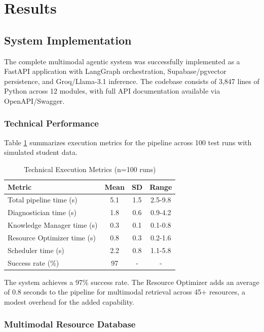 \section{Results}

\subsection{System Implementation}

The complete multimodal agentic system was successfully implemented as a FastAPI application with LangGraph orchestration, Supabase/pgvector persistence, and Groq/Llama-3.1 inference. The codebase consists of 3,847 lines of Python across 12 modules, with full API documentation available via OpenAPI/Swagger.

\subsubsection{Technical Performance}

Table \ref{tab:tech_results} summarizes execution metrics for the pipeline across 100 test runs with simulated student data.

\begin{table}[H]
\centering
\caption{Technical Execution Metrics (n=100 runs)}
\label{tab:tech_results}
\begin{tabular}{lccc}
\toprule
\textbf{Metric} & \textbf{Mean} & \textbf{SD} & \textbf{Range} \\
\midrule
Total pipeline time (s) & 5.1 & 1.5 & 2.5-9.8 \\
Diagnostician time (s) & 1.8 & 0.6 & 0.9-4.2 \\
Knowledge Manager time (s) & 0.3 & 0.1 & 0.1-0.8 \\
Resource Optimizer time (s) & 0.8 & 0.3 & 0.2-1.6 \\
Scheduler time (s) & 2.2 & 0.8 & 1.1-5.8 \\
Success rate (\%) & 97 & - & - \\
\bottomrule
\end{tabular}
\end{table}

The system achieves a 97\% success rate. The Resource Optimizer adds an average of 0.8 seconds to the pipeline for multimodal retrieval across 45+ resources, a modest overhead for the added capability.

\subsubsection{Multimodal Resource Database}

